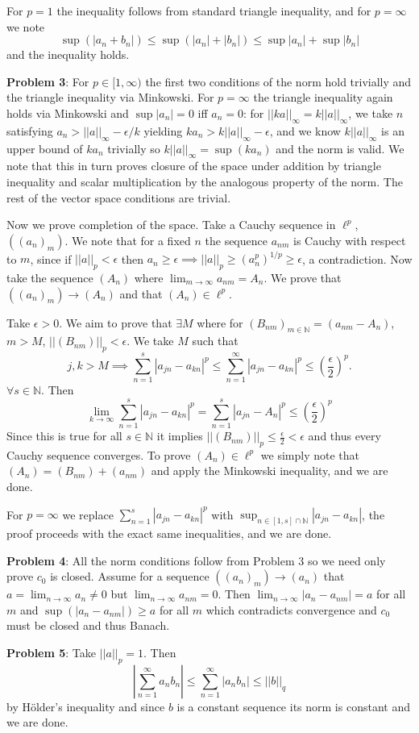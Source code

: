 \documentclass{amsart}
\begin{document}
\medskip \noindent For $p=1$ the inequality follows from standard triangle inequality, and for $p=\infty$ we note \[\sup(|a_n+b_n|)\leq \sup(|a_n|+|b_n|)\leq\sup|a_n|+\sup|b_n|\] and the inequality holds.

\medskip \noindent \textbf{Problem 3}:
For $p\in [1, \infty)$ the first two conditions of the norm hold trivially and the triangle inequality via Minkowski. For $p=\infty$ the triangle inequality again holds via Minkowski and $\sup|a_n|=0$ iff $a_n=0$: for $||ka||_\infty = k||a||_\infty$, we take $n$ satisfying $a_n>||a||_\infty-\epsilon/k$ yielding $ka_n>k||a||_\infty-\epsilon$, and we know $k||a||_\infty$ is an upper bound of $ka_n$ trivially so $k||a||_\infty=\sup(ka_n)$ and the norm is valid.
We note that this in turn proves closure of the space under addition by triangle inequality and scalar multiplication by the analogous property of the norm. The rest of the vector space conditions are trivial.

\medskip \noindent Now we prove completion of the space.
Take a Cauchy sequence in $\ell^p$, $((a_n)_m)$. We note that for a fixed $n$ the sequence $a_{nm}$ is Cauchy with respect to $m$, since if $||a||_p<\epsilon$ then $a_n\geq \epsilon\implies ||a||_p\geq(a_n^p)^{1/p}\geq\epsilon$, a contradiction.
Now take the sequence $(A_n)$ where $\lim_{m\to\infty}a_{nm} = A_n$. We prove that $((a_n)_m)\to (A_n)$ and that $(A_n)\in \ell^p$. 

\medskip \noindent Take $\epsilon>0$. We aim to prove that $\exists M$ where for $(B_{nm})_{m\in \mathbb{N}} = (a_{nm}-A_n)$, $m>M$, $||(B_{nm})||_p<\epsilon$. 
We take $M$ such that \[j,k>M\implies\sum_{n=1}^s|a_{jn}-a_{kn}|^p\leq\sum_{n=1}^\infty|a_{jn}-a_{kn}|^p\leq\left(\frac{\epsilon}{2}\right)^p.\]
$\forall s\in \mathbb{N}$. Then
\[\lim_{k\to\infty}\sum_{n=1}^s|a_{jn}-a_{kn}|^p=\sum_{n=1}^s|a_{jn}-A_n|^p\leq\left(\frac{\epsilon}{2}\right)^p\]
Since this is true for all $s\in \mathbb{N}$ it implies $||(B_{nm})||_p\leq \frac{\epsilon}{2}<\epsilon$ and thus every Cauchy sequence converges. To prove $(A_n)\in\ell^p$ we simply note that $(A_n) = (B_{nm})+(a_{nm})$ and apply the Minkowski inequality, and we are done.

\medskip \noindent For $p=\infty$ we replace $\sum_{n=1}^s|a_{jn}-a_{kn}|^p$ with $\sup_{n\in [1, s]\cap \mathbb{N}}|a_{jn}-a_{kn}|$, the proof proceeds with the exact same inequalities, and we are done.

\medskip \noindent \textbf{Problem 4}: 
All the norm conditions follow from Problem 3 so we need only prove $c_0$ is closed.
Assume for a sequence $((a_n)_m)\to (a_n)$ that $a=\lim_{n\to\infty} a_n\neq 0$ but $\lim_{n\to\infty} a_{nm} =0$. Then $\lim_{n\to\infty}|a_n-a_{nm}|=a$ for all $m$ and $\sup(|a_n-a_{nm}|)\geq a$ for all $m$ which contradicts convergence and $c_0$ must be closed and thus Banach.

\medskip \noindent \textbf{Problem 5}:
Take $||a||_p = 1$. Then \[\left|\sum_{n=1}^\infty a_nb_n\right|\leq \sum_{n=1}^\infty |a_nb_n|\leq ||b||_q\] by H\"{o}lder's inequality and since $b$ is a constant sequence its norm is constant and we are done.
\end{document}
